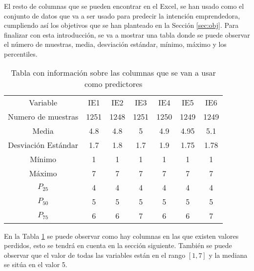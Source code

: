 El resto de columnas que se pueden encontrar en el Excel, se han usado como el conjunto de datos que va a ser usado para predecir la intención emprendedora, cumpliendo así los objetivos que se han planteado en la Sección \ref{sec:obj}.
\clearpage
Para finalizar con esta introducción, se va a mostrar una tabla donde se puede observar el número de muestras, media, desviación estándar, mínimo, máximo y los percentiles.
\begin{table}[H]
	\centering
	\begin{tabular}{|c|c|c|c|c|c|c|}
		\cline{1-7}
		Variable            & IE1  & IE2  & IE3  & IE4  & IE5  & IE6  \\ \cline{1-7}
		Numero de muestras  & 1251 & 1248 & 1251 & 1250 & 1249 & 1249 \\ \cline{1-7}
		Media               & 4.8  & 4.8  & 5    & 4.9  & 4.95 & 5.1  \\ \cline{1-7}
		Desviación Estándar & 1.7  & 1.8  & 1.7  & 1.9  & 1.75 & 1.78 \\ \cline{1-7}
		Mínimo              & 1    & 1    & 1    & 1    & 1    & 1    \\ \cline{1-7}
		Máximo              & 7    & 7    & 7    & 7    & 7    & 7    \\ \cline{1-7}
		$P_{25}$            & 4    & 4    & 4    & 4    & 4    & 4    \\ \cline{1-7}
		$P_{50}$            & 5    & 5    & 5    & 5    & 5    & 5    \\ \cline{1-7}
		$P_{75}$            & 6    & 6    & 7    & 6    & 6    & 7    \\ \cline{1-7}
	\end{tabular}
	\caption{Tabla con información sobre las columnas que se van a usar como predictores}
	\label{tab:ie_exp}
\end{table}
En la Tabla \ref{tab:ie_exp} se puede observar como hay columnas en las que existen valores perdidos, esto se tendrá en cuenta en la sección siguiente. También se puede observar que el valor de todas las variables están en el rango $\left[1,7\right]$ y la mediana se sitúa en el valor 5.
